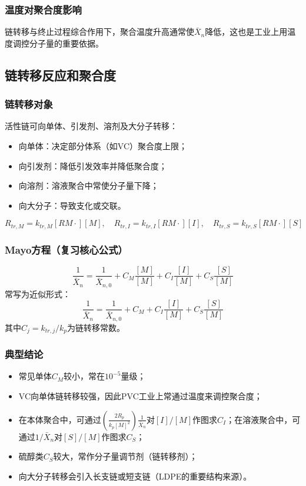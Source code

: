 ﻿\documentclass[12pt,a4paper]{article}
\begin{document}
\subsubsection{温度对聚合度影响}
链转移与终止过程综合作用下，聚合温度升高通常使$\bar{X}_n$降低，这也是工业上用温度调控分子量的重要依据。

\subsection{链转移反应和聚合度}
\subsubsection{链转移对象}
活性链可向单体、引发剂、溶剂及大分子转移：
\begin{itemize}
  \item 向单体：决定部分体系（如VC）聚合度上限；
  \item 向引发剂：降低引发效率并降低聚合度；
  \item 向溶剂：溶液聚合中常使分子量下降；
  \item 向大分子：导致支化或交联。
\end{itemize}
\[
R_{tr,M}=k_{tr,M}[RM\cdot][M],\quad
R_{tr,I}=k_{tr,I}[RM\cdot][I],\quad
R_{tr,S}=k_{tr,S}[RM\cdot][S]
\]

\subsubsection{Mayo方程（复习核心公式）}
\[
\frac{1}{\bar{X}_n}=\frac{1}{\bar{X}_{n,0}}+C_M\frac{[M]}{[M]}+C_I\frac{[I]}{[M]}+C_S\frac{[S]}{[M]}
\]
常写为近似形式：
\[
\frac{1}{\bar{X}_n}=\frac{1}{\bar{X}_{n,0}}+C_M+C_I\frac{[I]}{[M]}+C_S\frac{[S]}{[M]}
\]
其中$C_j=k_{tr,j}/k_p$为链转移常数。

\subsubsection{典型结论}
\begin{itemize}
  \item 常见单体$C_M$较小，常在$10^{-5}$量级；
  \item VC向单体链转移较强，因此PVC工业上常通过温度来调控聚合度；
  \item 在本体聚合中，可通过$\left(\frac{2R_p}{k_p[M]^2}\right)\frac{1}{\bar{X}_n}$对$[I]/[M]$作图求$C_I$；在溶液聚合中，可通过$1/\bar{X}_n$对$[S]/[M]$作图求$C_S$；
  \item 硫醇类$C_S$较大，常作分子量调节剂（链转移剂）；
  \item 向大分子转移会引入长支链或短支链（LDPE的重要结构来源）。
\end{itemize}
\end{document}
